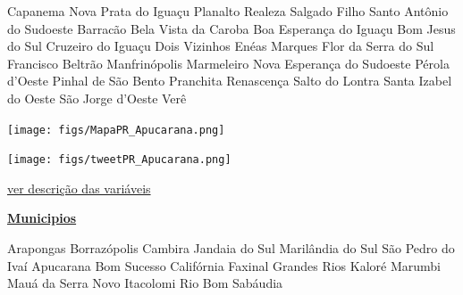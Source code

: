 \documentclass[10pt]{article} %
\begin{document}
\begin{minipage}[t]{.30\linewidth}
\begin{mdframed}[style=sidebar,frametitle={}]
\begin{itemize}
\gsquare Capanema 
\gsquare Nova Prata do Iguaçu 
\gsquare Planalto 
\gsquare Realeza 
\gsquare Salgado Filho 
\gsquare Santo Antônio do Sudoeste 
\gsquare Barracão 
\gsquare Bela Vista da Caroba 
\gsquare Boa Esperança do Iguaçu 
\gsquare Bom Jesus do Sul 
\gsquare Cruzeiro do Iguaçu 
\gsquare Dois Vizinhos 
\gsquare Enéas Marques 
\gsquare Flor da Serra do Sul 
\gsquare Francisco Beltrão 
\gsquare Manfrinópolis 
\gsquare Marmeleiro 
\gsquare Nova Esperança do Sudoeste 
\gsquare Pérola d'Oeste 
\gsquare Pinhal de São Bento 
\gsquare Pranchita 
\gsquare Renascença 
\gsquare Salto do Lontra 
\gsquare Santa Izabel do Oeste 
\gsquare São Jorge d'Oeste 
\gsquare Verê 
\end{itemize}\BackToContents\end{mdframed}\hfill\end{minipage}\newpage\begin{minipage}[t]{.66\linewidth}
\hypertarget{Apcr}{}
\texttt{[image: figs/MapaPR\_Apucarana.png]}\vspace{0.5cm}\vspace{0.5cm}\begin{center}
\texttt{[image: figs/tweetPR\_Apucarana.png]}\end{center}
\begin{center}

\end{center}
\small{\hyperlink{vartab}{ver descrição das variáveis}}\end{minipage}\hfill\begin{minipage}[t]{.30\linewidth}
\begin{mdframed}[style=sidebar,frametitle={}]
\textbf{\hyperlink{municips}{Municipios}}\begin{itemize}\gsquare Arapongas 
\gsquare Borrazópolis 
\gsquare Cambira 
\gsquare Jandaia do Sul 
\gsquare Marilândia do Sul 
\gsquare São Pedro do Ivaí 
\gsquare Apucarana 
\gsquare Bom Sucesso 
\gsquare Califórnia 
\gsquare Faxinal 
\gsquare Grandes Rios 
\gsquare Kaloré 
\gsquare Marumbi 
\gsquare Mauá da Serra 
\gsquare Novo Itacolomi 
\gsquare Rio Bom 
\gsquare Sabáudia 
\end{itemize}\BackToContents\end{mdframed}\hfill\end{minipage}\newpage\begin{minipage}[t]{.66\linewidth}

\end{minipage}
\end{document}
